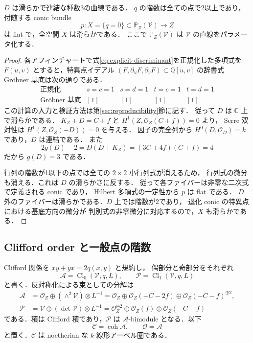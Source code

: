 \begin{lemma}
\label{lem:smooth-discriminant}
$D$ は滑らかで連結な種数3の曲線である．
$q$ の階数は全ての点で2以上であり，付随する conic bundle
\[
 p:X=\{q=0\}\subset\mathbb P_Z(\mathcal V)\longrightarrow Z
\]
は flat で，全空間 $X$ は滑らかである．
ここで $\mathbb P_Z(\mathcal V)$ は $\mathcal V$ の直線をパラメータ化する．
\end{lemma}

\begin{proof}
各アフィンチャートで式\eqref{eq:explicit-discriminant}を正規化した多項式を
$F(u,v)$ とすると，特異点イデアル
$(F,\partial_uF,\partial_vF)\subset\mathbb Q[u,v]$ の辞書式
Gr\"obner 基底は次の通りである．
\[
\begin{array}{c|cccc}
\text{正規化}&s=c=1&s=d=1&t=c=1&t=d=1\\\hline
\text{Gr\"obner 基底}&[1]&[1]&[1]&[1]
\end{array}
\]
この計算の入力と検証方法は第\ref{sec:reproducibility}節に記す．
従って $D$ は $\mathbb C$ 上で滑らかである．
$K_Z+D=C+f$ と $H^1(Z,\mathcal O_Z(C+f))=0$ より，
Serre 双対性は $H^1(Z,\mathcal O_Z(-D))=0$ を与える．
因子の完全列から $H^0(D,\mathcal O_D)=k$ であり，$D$ は連結である．
また
\[
 2g(D)-2=D(D+K_Z)=(3C+4f)(C+f)=4
\]
だから $g(D)=3$ である．

行列の階数が1以下の点では全ての $2\times2$ 小行列式が消えるため，
行列式の微分も消える．これは $D$ の滑らかさに反する．
従って各ファイバーは非零な二次式で定義される conic であり，
Hilbert 多項式の一定性から $p$ は flat である．
$D$ 外のファイバーは滑らかである．$D$ 上では階数が2であり，
退化 conic の特異点における基底方向の微分が
判別式の非零微分に対応するので，$X$ も滑らかである．
\end{proof}

\subsection{Clifford order と一般点の階数}

Clifford 関係を $xy+yx=2q(x,y)$ と規約し，
偶部分と奇部分をそれぞれ
\[
 \mathcal A=\operatorname{Cl}_0(\mathcal V,q,L),\qquad
 \mathcal P=\operatorname{Cl}_1(\mathcal V,q,L)
\]
と書く．反対称化による束としての分解は
\begin{equation}
 \begin{split}
 \mathcal A
  &=\mathcal O_Z\oplus
     (\wedge^2\mathcal V)\otimes L^{-1}
    =\mathcal O_Z\oplus\mathcal O_Z(-C-2f)
       \oplus\mathcal O_Z(-C-f)^{\oplus2},\\
 \mathcal P
  &=\mathcal V\oplus(\det\mathcal V)\otimes L^{-1}
    =\mathcal O_Z^{\oplus2}\oplus\mathcal O_Z(f)
       \oplus\mathcal O_Z(-C-f)
 \end{split}
 \label{eq:underlying-bundles}
\end{equation}
である．積は Clifford 積であり，$\mathcal P$ は
$\mathcal A$-bimodule となる．以下
\[
 \mathcal C=\operatorname{coh}\mathcal A,\qquad
 \mathcal O=\mathcal A
\]
と置く．$\mathcal C$ は noetherian な $k$-線形アーベル圏である．

